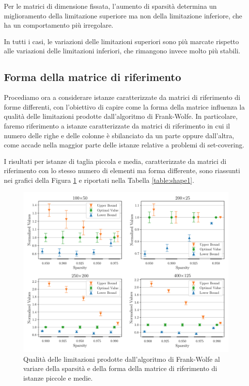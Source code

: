 Per le matrici di dimensione fissata, l'aumento di sparsità determina un miglioramento della limitazione superiore ma
non della limitazione inferiore, che ha un comportamento più irregolare.

In tutti i casi, le variazioni delle limitazioni superiori sono più marcate rispetto alle variazioni delle limitazioni
inferiori, che rimangono invece molto più stabili.

\subsection{Forma della matrice di riferimento}
Procediamo ora a considerare istanze caratterizzate da matrici di riferimento di forme differenti, con l'obiettivo di
capire come la forma della matrice influenza la qualità delle limitazioni prodotte dall'algoritmo di Frank-Wolfe. In
particolare, faremo riferimento a istanze caratterizzate da matrici di riferimento in cui il numero delle righe e delle
colonne è sbilanciato da un parte oppure dall'altra, come accade nella maggior parte delle istanze relative a problemi
di set-covering.

I risultati per istanze di taglia piccola e media, caratterizzate da matrici di riferimento con lo stesso numero di
elementi ma forma differente, sono riassunti nei grafici della Figura \ref{fig:shape1} e riportati nella Tabella
\ref{table:shape1}.

\begin{figure}[ht]
    \centering
    \includegraphics[width=\textwidth]{assets/figures/shape1.pdf}
    \caption{Qualità delle limitazioni prodotte dall’algoritmo di Frank-Wolfe al variare della sparsità e della forma
    della matrice di riferimento di istanze piccole e medie.}
    \label{fig:shape1}
\end{figure}

